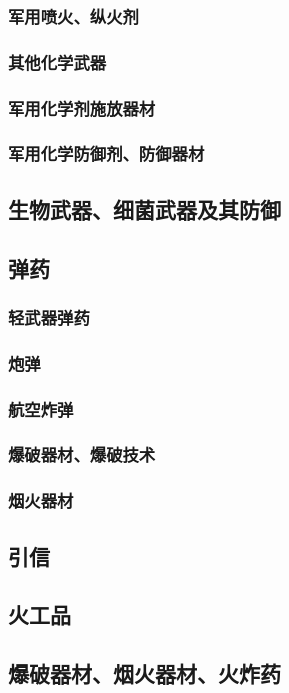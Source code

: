 \documentclass[UTF8]{../ApplicationUniverse}
\begin{document}
        \subsubsection{军用喷火、纵火剂}
        \subsubsection{其他化学武器}
        \subsubsection{军用化学剂施放器材}
        \subsubsection{军用化学防御剂、防御器材}
    \subsection{生物武器、细菌武器及其防御}
    \subsection{弹药}
        \subsubsection{轻武器弹药}
        \subsubsection{炮弹}
        \subsubsection{航空炸弹}
        \subsubsection{爆破器材、爆破技术}
        \subsubsection{烟火器材}
    \subsection{引信}
    \subsection{火工品}
    \subsection{爆破器材、烟火器材、火炸药}
\end{document}
